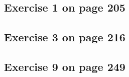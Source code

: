 \documentclass[12pt]{amsart}
\begin{document}
\subsection{Exercise 1 on page 205} 
\subsection{Exercise 3 on page 216}
\subsection{Exercise 9 on page 249}
\end{document}
